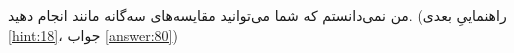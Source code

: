 \section{}
\paragraph{}\label{hint:312}
من نمی‌دانستم که شما می‌توانید مقایسه‌های سه‌گانه مانند  انجام دهید. (راهنماییِ بعدی \ref{hint:18}، جواب \ref{answer:80})